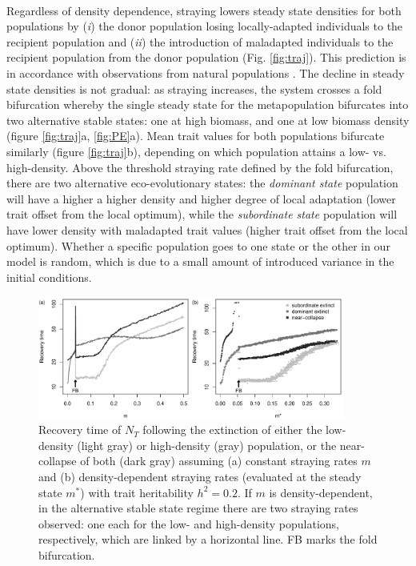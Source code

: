 \documentclass[twocolumn,preprintnumbers,amsmath,amssymb,superscriptaddress]{revtex4}
\begin{document}

 \\
\noindent Regardless of density dependence, straying lowers steady state densities for both populations by (\emph{i}) the donor population losing locally-adapted individuals to the recipient population and (\emph{ii}) the introduction of maladapted individuals to the recipient population from the donor population (Fig. \ref{fig:traj}).
This prediction is in accordance with observations from natural populations \cite{Bett:2017ha}. %
The decline in steady state densities is not gradual: as straying increases, the system crosses a fold bifurcation whereby the single steady state for the metapopulation bifurcates into two alternative stable states: one at high biomass, and one at low biomass density (figure \ref{fig:traj}a, \ref{fig:PE}a).
Mean trait values for both populations bifurcate similarly (figure \ref{fig:traj}b), depending on which population attains a low- vs. high-density. 
Above the threshold straying rate defined by the fold bifurcation, there are two alternative eco-evolutionary states: the \emph{dominant state} population will have a higher a higher density and higher degree of local adaptation (lower trait offset from the local optimum), while the \emph{subordinate state} population will have lower density with maladapted trait values (higher trait offset from the local optimum). 
Whether a specific population goes to one state or the other in our model is random, which is due to a small amount of introduced variance in the initial conditions.


\begin{figure}
  \captionsetup{justification=raggedright,
singlelinecheck=false
}
\centering
\includegraphics[width=0.9\textwidth]{figs2/fig_relax_lowh.pdf}
\caption{
Recovery time of $N_T$ following the extinction of either the low-density (light gray) or high-density (gray) population, or the near-collapse of both (dark gray) assuming (a) constant straying rates $m$ and (b) density-dependent straying rates (evaluated at the steady state $m^*$) with trait heritability $h^2=0.2$.
If $m$ is density-dependent, in the alternative stable state regime there are two straying rates observed: one each for the low- and high-density populations, respectively, which are linked by a horizontal line.
FB marks the fold bifurcation.
} \label{fig:relax}
\end{figure}
\end{document}
